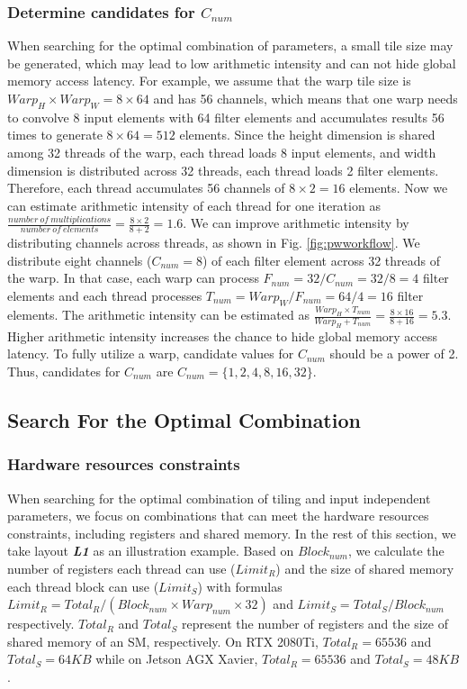\subsubsection{Determine candidates for $C_{num}$\label{sec:cnum}} 
When searching for the optimal combination of parameters, a small tile size may be generated, which may lead to low arithmetic intensity and can not hide global memory access latency.
 For example, we assume that the warp tile size is $Warp_H \times Warp_W = 8 \times 64$ and has 56 channels, which means that one warp needs to convolve 8 input elements with 64 filter elements and accumulates results 56 times to generate $8 \times 64=512$ elements. Since the height dimension is shared among 32 threads of the warp, each thread loads 8 input elements, and width dimension is distributed across 32 threads, each thread loads 2 filter elements. Therefore, each thread accumulates 56 channels of $8 \times 2=16$ elements. Now we can estimate arithmetic intensity of each thread for one iteration as $\frac{number\ of\ multiplications}{number\ of\ elements}=\frac{8 \times 2}{8 + 2}=1.6$. We can improve arithmetic intensity by distributing channels across threads, as shown in Fig. \ref{fig:pwworkflow}. We distribute eight channels ($C_{num}=8$) of each filter element across 32 threads of the warp.
 In that case, each warp can process $F_{num}=32/C_{num}=32/8=4$ filter elements and each thread processes $T_{num}=Warp_W/F_{num}=64/4=16$ filter elements.
 The arithmetic intensity can be estimated as $\frac{Warp_H \times T_{num}}{Warp_H + T_{num}}=\frac{8 \times 16}{8+16}=5.3$.
 Higher arithmetic intensity increases the chance to hide global memory access latency.
To fully utilize a warp, candidate values for $C_{num}$ should be a power of 2.
Thus, candidates for $C_{num}$ are $C_{num}=\{1,2,4,8,16,32\}$.


\subsection{Search For the Optimal Combination}
\subsubsection{Hardware resources constraints}
When searching for the optimal combination of tiling and input independent parameters, we focus on combinations that can meet the hardware resources constraints,
including registers and shared memory. In the rest of this section, we take layout \textbf{\emph{L1}} as an illustration example. Based on
$Block_{num}$, we calculate the number of registers each thread can use ($Limit_R$) and the size of shared memory each thread block can use
($Limit_S$) with formulas $Limit_R=Total_R/(Block_{num}\times Warp_{num} \times 32)$ and $Limit_S=Total_S/Block_{num}$ respectively.
$Total_R$ and $Total_S$ represent the number of registers and the size of shared memory of an SM, respectively. On RTX 2080Ti,
$Total_R=65536$ and $Total_S=64KB$ while  on Jetson AGX Xavier, $Total_R=65536$ and $Total_S=48KB$.

